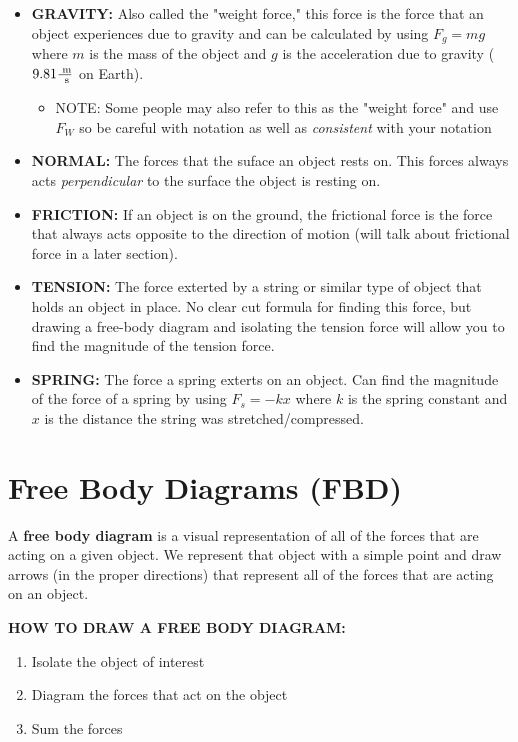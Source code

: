 \begin{itemize}
	\item \textbf{GRAVITY:} Also called the "weight force," this force is the force that an object experiences due to gravity and can be calculated by using $F_g = mg$ where $m$ is the mass of the object and $g$ is the acceleration due to gravity ($9.81\frac{\text{ m}}{\text{ s}}$ on Earth).
	\begin{itemize}
		\item NOTE: Some people may also refer to this as the "weight force" and use $F_W$ so be careful with notation as well as \textit{consistent} with your notation
	\end{itemize}
	\item \textbf{NORMAL:} The forces that the suface an object rests on. This forces always acts \textit{perpendicular} to the surface the object is resting on.
	\item \textbf{FRICTION:} If an object is on the ground, the frictional force is the force that always acts opposite to the direction of motion (will talk about frictional force in a later section).
	\item \textbf{TENSION:} The force exterted by a string or similar type of object that holds an object in place. No clear cut formula for finding this force, but drawing a free-body diagram and isolating the tension force will allow you to find the magnitude of the tension force. 
	\item \textbf{SPRING:} The force a spring exterts on an object. Can find the magnitude of the force of a spring by using $F_s = -kx$ where $k$ is the spring constant and $x$ is the distance the string was stretched/compressed.
\end{itemize}


\section{Free Body Diagrams (FBD)}

A \textbf{free body diagram} is a visual representation of all of the forces that are acting on a given object. We represent that object with a simple point and draw arrows (in the proper directions) that represent all of the forces that are acting on an object.\\

\begin{center}\textbf{HOW TO DRAW A FREE BODY DIAGRAM:}\end{center}
\begin{enumerate}
	\item Isolate the object of interest
	\item Diagram the forces that act on the object
	\item Sum the forces
\end{enumerate}

